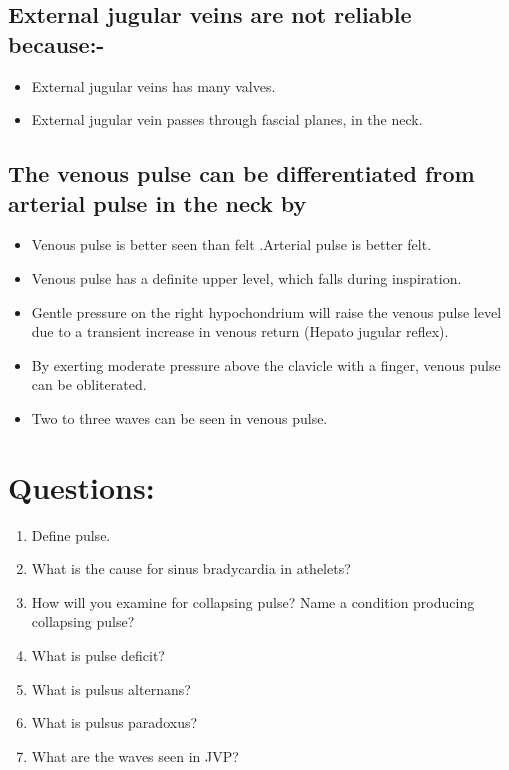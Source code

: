 \documentclass[a4paper,12pt]{book}
\begin{document}
\subsection*{External jugular veins are not reliable because:-}
\begin{itemize}
	\item[]{External jugular veins has many valves.}
	\item[]{External jugular vein passes through fascial planes, in the neck. }
\end{itemize}
\subsection*{The venous pulse can be differentiated from arterial pulse in the neck by}
\begin{itemize}
\item[]{Venous pulse is better seen than felt .Arterial pulse is better felt.}
\item[]{Venous pulse has a definite upper level, which falls during inspiration.}
\item[]{Gentle pressure on the right hypochondrium will raise the venous pulse level due to a transient increase in venous return (Hepato jugular reflex).}
\item[]{By exerting moderate pressure above the clavicle with a finger, venous pulse can be obliterated.}
\item[]{Two to three waves can be seen in venous pulse.}
\end{itemize}

\section*{Questions:}
\begin{enumerate}
\item{Define pulse.}
\item{What is the cause for sinus bradycardia in athelets?}
\item{How will you examine for collapsing pulse? Name a condition producing collapsing pulse?}
\item{What is pulse deficit?}
\item{What is pulsus alternans?}
\item{What is pulsus paradoxus?}
\item{What are the waves seen in JVP?}
\end{enumerate}
\end{document}

